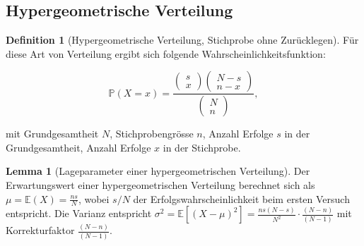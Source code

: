 \documentclass{article}
\theoremstyle{definition}
\newtheorem{definition}{Definition}
\theoremstyle{exercise}
\theoremstyle{solution}
\theoremstyle{lemma}
\newtheorem{lemma}{Lemma}
\begin{document}
\subsection{Hypergeometrische Verteilung}
\begin{definition}[Hypergeometrische Verteilung, Stichprobe ohne Zurücklegen]
Für diese Art von Verteilung ergibt sich folgende Wahrscheinlichkeitsfunktion:

\begin{equation}
\mathbb{P}(X=x)=\frac{\begin{pmatrix} s \\ x \end{pmatrix} \begin{pmatrix} N-s \\ n-x \end{pmatrix}}{\begin{pmatrix} N \\ n \end{pmatrix}},
\end{equation}

mit Grundgesamtheit $N$, Stichprobengrösse $n$, Anzahl Erfolge $s$ in der Grundgesamtheit, Anzahl Erfolge $x$ in der Stichprobe.
\end{definition}

\begin{lemma}[Lageparameter einer hypergeometrischen Verteilung]
Der Erwartungswert einer hypergeometrischen Verteilung berechnet sich als $\mu=\mathbb{E}(X)=\frac{ns}{N}$, wobei $s/N$ der Erfolgswahrscheinlichkeit beim ersten Versuch entspricht. Die Varianz entspricht $\sigma^2=\mathbb{E}[(X-\mu)^2]=\frac{ns(N-s)}{N^2}\cdot\frac{(N-n)}{(N-1)}$ mit Korrekturfaktor $\frac{(N-n)}{(N-1)}$.
\end{lemma}
\end{document}
